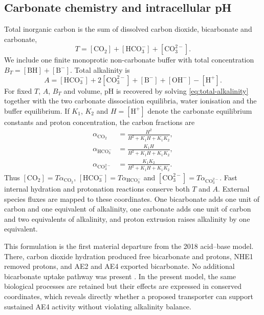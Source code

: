 \documentclass[11pt]{article}
\newcommand{\HCO}{\mathrm{HCO}_{3}^{-}}
\newcommand{\COthree}{\mathrm{CO}_{3}^{2-}}
\begin{document}
\subsection{Carbonate chemistry and intracellular pH}
\label{sec:acid-base}

Total inorganic carbon is the sum of dissolved carbon dioxide, bicarbonate and carbonate,
\begin{equation*}
    T=[\mathrm{CO}_2]+[\HCO]+[\COthree].
\end{equation*}
We include one finite monoprotic non-carbonate buffer with total concentration $B_T=[\mathrm{BH}]+[\mathrm{B}^{-}]$. Total alkalinity is
\begin{equation}
    A=[\HCO]+2[\COthree]+[\mathrm{B}^{-}]+[\mathrm{OH}^{-}]-[\mathrm{H}^{+}].
    \label{eq:total-alkalinity}
\end{equation}
For fixed $T$, $A$, $B_T$ and volume, pH is recovered by solving \cref{eq:total-alkalinity} together with the two carbonate dissociation equilibria, water ionisation and the buffer equilibrium. If $K_1$, $K_2$ and $H=[\mathrm H^+]$ denote the carbonate equilibrium constants and proton concentration, the carbon fractions are
\begin{align*}
    \alpha_{\mathrm{CO}_2}&=\frac{H^2}{H^2+K_1H+K_1K_2},\\
    \alpha_{\HCO}&=\frac{K_1H}{H^2+K_1H+K_1K_2},\\
    \alpha_{\COthree}&=\frac{K_1K_2}{H^2+K_1H+K_1K_2}.
\end{align*}
Thus $[\mathrm{CO}_2]=T\alpha_{\mathrm{CO}_2}$, $[\HCO]=T\alpha_{\HCO}$ and $[\COthree]=T\alpha_{\COthree}$. Fast internal hydration and protonation reactions conserve both $T$ and $A$. External species fluxes are mapped to these coordinates. One bicarbonate adds one unit of carbon and one equivalent of alkalinity, one carbonate adds one unit of carbon and two equivalents of alkalinity, and proton extrusion raises alkalinity by one equivalent.

This formulation is the first material departure from the 2018 acid--base model. There, carbon dioxide hydration produced free bicarbonate and protons, NHE1 removed protons, and AE2 and AE4 exported bicarbonate. No additional bicarbonate uptake pathway was present \citep{VeraSiguenza2018}. In the present model, the same biological processes are retained but their effects are expressed in conserved coordinates, which reveals directly whether a proposed transporter can support sustained AE4 activity without violating alkalinity balance.
\end{document}

